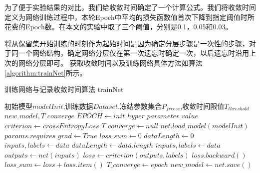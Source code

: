 为了便于实验结果的对比，我们给收敛时间确定了一个计算公式。我们将收敛时间定义为网络训练过程中，本轮Epoch中平均的损失函数值首次下降到指定阈值时所花费的Epoch数。在本文的实验中取了三个阈值，分别是0.1，0.05和0.03。

将从保留集开始训练的时刻作为起始时间是因为确定分层步骤是一次性的步骤，对于同一个网络结构，确定网络分层仅在第一次遗忘时确定一次，以后遗忘时沿用上次的网络分层即可。
获取收敛时间以及训练网络具体方法如算法\ref{algorithm:trainNet}所示。
\begin{algorithm}
	\renewcommand{\algorithmicrequire}{\textbf{Input:}}
	\renewcommand{\algorithmicensure}{\textbf{Output:}}
	\caption{训练网络与记录收敛时间算法  trainNet}
	\label{algorithm:trainNet}
	\begin{algorithmic}[1]
        \REQUIRE 初始模型$modelInit$,训练数据$Dataset$,冻结参数集合$P_{freeze}$,收敛时间限值$T_{threshold}$
        \ENSURE  $new\_model,T\_converge $
        \STATE $EPOCH \gets init\_hyper\_parameter\_value$
        \STATE $criterion \gets crossEntropyLoss$
        \STATE $T\_converge \gets null$
        \STATE $net.load\_model(modelInit)$
                \STATE $params.requires\_grad \gets True$
            \ENDIF
        \ENDFOR
            \STATE $loss\_sum \gets 0$
            \STATE $dataLength \gets 0$
            \STATE $inputs, labels \gets data$
            \STATE $dataLength \gets data.length$
                \STATE $inputs,labels \gets data$
                \STATE $outputs \gets net(inputs)$
                \STATE $loss \gets criterion(outputs, labels)$
                \STATE $loss.backward()$
                \STATE $loss\_sum \gets loss + loss.item()$
            \ENDFOR
                \STATE $T\_converge \gets epoch$
            \ENDIF
        \ENDFOR
        \STATE $new\_model \gets net.save()$
	\end{algorithmic}  
\end{algorithm}

